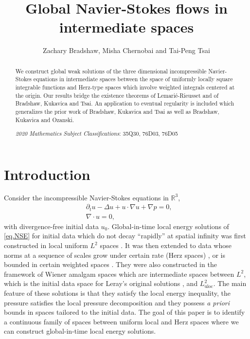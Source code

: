 \documentclass[11pt]{article}
\numberwithin{equation}{section}
\theoremstyle{remark}
\theoremstyle{definition}
\newcommand{\R}{\mathbb{R}}
\newcommand{\EQS}[1]{\begin{equation}\begin{split} #1 \end{split}\end{equation}}
\newcommand{\uloc}{{\mathrm{uloc}}}
\begin{document}
\title{Global Navier-Stokes flows in intermediate spaces}


\author{Zachary Bradshaw, Misha Chernobai and Tai-Peng Tsai}
\date{}
\maketitle


%

\begin{abstract}

%
We construct global weak solutions of the three dimensional incompressible Navier-Stokes equations in intermediate spaces between the space of uniformly locally square integrable functions and Herz-type spaces which involve weighted integrals centered at the origin.
Our results bridge the existence theorems of  Lemari\'e-Rieusset and of Bradshaw, Kukavica and Tsai. An application to eventual regularity is included which generalizes the prior work of Bradshaw, Kukavica and Tsai as well as Bradshaw, Kukavica and Ozanski.


\medskip

%

\medskip

\emph{2020 Mathematics Subject Classifications}: 35Q30, 76D03, 76D05
\end{abstract}

\setcounter{tocdepth}{1}
\renewcommand{\baselinestretch}{0.8}\normalsize
\tableofcontents
\renewcommand{\baselinestretch}{1.0}\normalsize


\section{Introduction}
Consider the incompressible Navier-Stokes equations in $\R^3$,
\EQS{\label{eq.NSE}
   &\partial_t u-\Delta u +u\cdot\nabla u+\nabla p = 0,
   \\& \nabla \cdot u=0,
   }
with divergence-free initial data $u_0$.
Global-in-time local energy solutions of \eqref{eq.NSE} for initial data which do not decay ``rapidly'' at spatial infinity was first constructed in local uniform $L^2$ spaces \cite{LR,KiSe,KwTs,MaMiPr}. It was then extended to data whose norms at a sequence of scales grow under certain rate (Herz spaces) \cite{Tsutsui,BT8,BKT,BKO,CW}, or is bounded in certain weighted spaces \cite{LR-Morrey,FDLR, Che}. They were also constructed
in the framework of Wiener amalgam spaces \cite{BT4,BLT} which are intermediate spaces between $L^2$, which is the initial data space for Leray's original solutions \cite{leray}, and $L^2_\uloc$.
The main feature of these solutions is that they satisfy the local energy inequality, the pressure satisfies the local pressure decomposition and they possess \textit{a priori} bounds in spaces tailored to the initial data.
The goal of this paper is to identify a continuous family of spaces between uniform local and Herz spaces where we can construct global-in-time local energy solutions.
\end{document}
